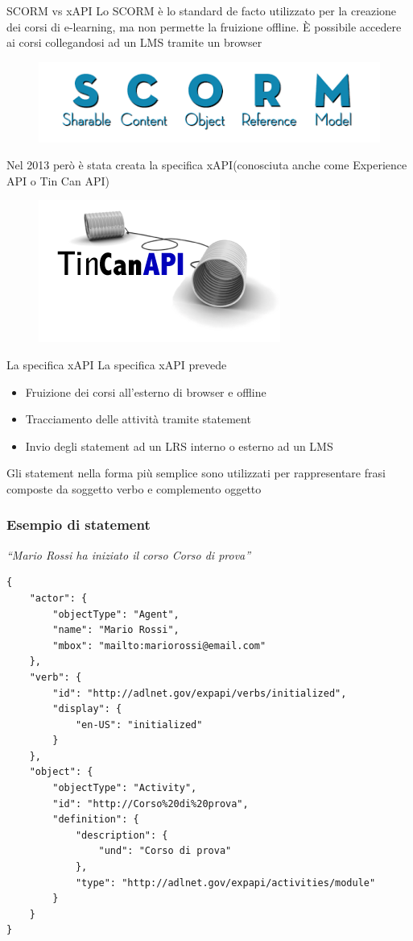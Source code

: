 \documentclass[aspectratio=43]{beamer}
\begin{document}
	\begin{frame}{SCORM vs xAPI}
		Lo SCORM è lo standard de facto utilizzato per la creazione dei corsi di e-learning, ma non permette la fruizione offline. È possibile accedere ai corsi collegandosi ad un LMS tramite un browser\\
		\begin{figure}[H]
			\centering
			\includegraphics[scale=0.5]{images/scorm}
		\end{figure}

		Nel 2013 però è stata creata la specifica xAPI(conosciuta anche come Experience API o Tin Can API)
		\begin{figure}[H]
			\centering
			\includegraphics[scale=0.5]{images/tincanapi}
		\end{figure}
	\end{frame}

	\begin{frame}{La specifica xAPI}
		La specifica xAPI prevede
		\begin{itemize}
			\item Fruizione dei corsi all'esterno di browser e offline
			\item Tracciamento delle attività tramite statement
			\item Invio degli statement ad un LRS interno o esterno ad un LMS
		\end{itemize}
		Gli statement nella forma più semplice sono utilizzati per rappresentare frasi composte da soggetto verbo e complemento oggetto
	\end{frame}

	\begin{frame}[fragile]
	\frametitle{Esempio di statement}
\textit{``Mario Rossi ha iniziato il corso Corso di prova''}
\begin{lstlisting}[basicstyle=\tiny]
{
    "actor": {
        "objectType": "Agent",
        "name": "Mario Rossi",
        "mbox": "mailto:mariorossi@email.com"
    },
    "verb": {
        "id": "http://adlnet.gov/expapi/verbs/initialized",
        "display": {
            "en-US": "initialized"
        }
    },
    "object": {
        "objectType": "Activity",
        "id": "http://Corso%20di%20prova",
        "definition": {
            "description": {
                "und": "Corso di prova"
            },
            "type": "http://adlnet.gov/expapi/activities/module"
        }
    }
}
\end{lstlisting}
\end{frame}
\end{document}
